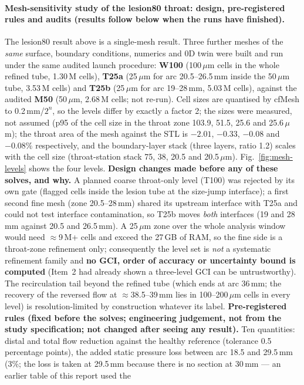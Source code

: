 \documentclass[11pt]{article}
\begin{document}
\paragraph{Mesh-sensitivity study of the lesion80 throat: design, pre-registered rules and audits (results follow below when the runs have finished).}
\label{sec:sens-design}
The lesion80 result above is a single-mesh result. Three further meshes of the \emph{same} surface, boundary conditions, numerics and 0D twin were built and run under the same audited launch procedure: \textbf{W100} (100\,$\mu$m cells in the whole refined tube, 1.30\,M cells), \textbf{T25a} (25\,$\mu$m for arc 20.5--26.5\,mm inside the 50\,$\mu$m tube, 3.53\,M cells) and \textbf{T25b}
(25\,$\mu$m for arc 19--28\,mm, 5.03\,M cells), against the audited \textbf{M50} (50\,$\mu$m, 2.68\,M cells; not re-run). Cell sizes are quantised by cfMesh to 0.2\,mm/$2^n$, so the levels differ by exactly a factor 2; the sizes were measured, not assumed (p95 of the cell size in the throat zone 103.9, 51.5, 25.6 and 25.6\,$\mu$m); the throat area of the mesh against the STL is
$-2.01$, $-0.33$, $-0.08$ and $-0.08\%$ respectively, and the boundary-layer stack (three layers, ratio 1.2) scales with the cell size (throat-station stack 75, 38, 20.5 and 20.5\,$\mu$m). Fig.~\ref{fig:mesh-levels} shows the four levels.
\textbf{Design changes made before any of these solves, and why.} A planned coarse throat-only level (T100) was rejected by its own gate (flagged cells inside the lesion tube at the size-jump interface); a first second fine mesh (zone 20.5--28\,mm) shared its upstream interface with T25a and could not test interface contamination, so T25b moves \emph{both}
interfaces (19 and 28\,mm against 20.5 and 26.5\,mm). A 25\,$\mu$m zone over the whole analysis window would need $\approx$9\,M+ cells and exceed the 27\,GB of RAM, so the fine side is a throat-zone refinement only; consequently the level set is \emph{not} a systematic refinement family and \textbf{no GCI, order of accuracy or uncertainty bound is computed}
(Item~2 had already shown a three-level GCI can be untrustworthy). The recirculation tail beyond the refined tube (which ends at arc 36\,mm; the recovery of the reversed flow at $\approx$38.5--39\,mm lies in 100--200\,$\mu$m cells in every level) is resolution-limited by construction whatever its label.
\textbf{Pre-registered rules (fixed before the solves; engineering judgement, not from the study specification; not changed after seeing any result).} Ten quantities: distal and total flow reduction against the healthy reference (tolerance 0.5 percentage points), the added static pressure loss between arc 18.5 and 29.5\,mm (3\%; the loss is taken at 29.5\,mm because there is no section at 30\,mm --- an earlier table of this report used the
\end{document}
